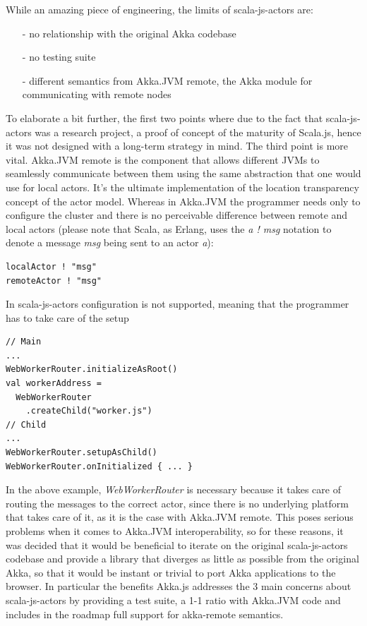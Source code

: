 \documentclass{sig-alternate}
\begin{document}
While an amazing piece of engineering, the limits of scala-js-actors are:
\begin{itemize}
\item[-] no relationship with the original Akka codebase
\item[-] no testing suite
\item[-] different semantics from Akka.JVM remote, the Akka module for communicating with remote nodes
\end{itemize}
To elaborate a bit further, the first two points where due to the fact that scala-js-actors was a research project, a proof of concept of the maturity of Scala.js, hence it was not designed with a long-term strategy in mind.
The third point is more vital. Akka.JVM remote is the component that allows different JVMs to seamlessly communicate between them using the same abstraction that one would use for local actors. It's the ultimate implementation of the location transparency concept of the actor model.
Whereas in Akka.JVM the programmer needs only to configure the cluster and there is no perceivable difference between 
remote and local actors (please note that Scala, as Erlang, uses the \emph{a ! msg} notation to denote a message \emph{msg}
being sent to an actor \emph{a}):
\begin{lstlisting}
localActor ! "msg"
remoteActor ! "msg"
\end{lstlisting}
In scala-js-actors configuration is not supported, meaning that the programmer has to take care of the setup
\begin{lstlisting}
// Main
...
WebWorkerRouter.initializeAsRoot()
val workerAddress = 
  WebWorkerRouter
    .createChild("worker.js")
// Child
...
WebWorkerRouter.setupAsChild()
WebWorkerRouter.onInitialized { ... }
\end{lstlisting}
In the above example, \emph{WebWorkerRouter} is necessary because it takes care of routing the messages to the
correct actor, since there is no underlying platform that takes care of it, as it is the case with Akka.JVM remote.
This poses serious problems when it comes to Akka.JVM interoperability, so for these reasons, it was decided 
that it would be beneficial to iterate on the original scala-js-actors codebase and provide a library that 
diverges as little as possible from the original Akka, so that it would be instant or trivial to port Akka 
applications to the browser.
In particular the benefits Akka.js addresses the 3 main concerns about scala-js-actors by providing a 
test suite, a 1-1 ratio with Akka.JVM code and includes in the roadmap full support for akka-remote
semantics.
\end{document}
